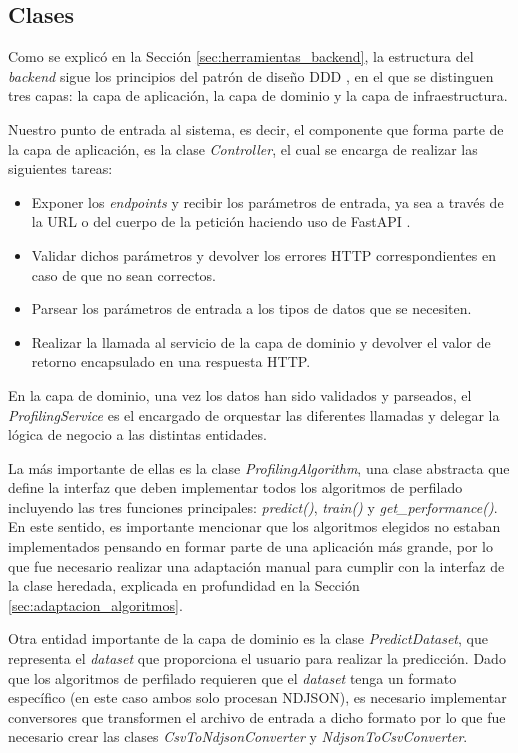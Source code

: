 \subsection{Clases}

\bigskip
Como se explicó en la Sección \ref{sec:herramientas_backend}, la estructura del \textit{backend} sigue los principios
del patrón de diseño DDD \cite{ddd}, en el que se distinguen tres capas: la capa de aplicación, la capa de dominio
y la capa de infraestructura.

\bigskip
Nuestro punto de entrada al sistema, es decir, el componente que forma parte de la capa de aplicación, es la clase
\textit{Controller}, el cual se encarga de realizar las siguientes tareas:

\begin{itemize}
	\item Exponer los \textit{endpoints} y recibir los parámetros de entrada, ya sea a través de la URL o del cuerpo de la petición
	      haciendo uso de FastAPI \cite{fastapi}.
	\item Validar dichos parámetros y devolver los errores HTTP correspondientes en caso de que no sean correctos.
	\item Parsear los parámetros de entrada a los tipos de datos que se necesiten.
	\item Realizar la llamada al servicio de la capa de dominio y devolver el valor de retorno encapsulado en una respuesta HTTP.
\end{itemize}

\bigskip
En la capa de dominio, una vez los datos han sido validados y parseados, el \textit{ProfilingService} es el encargado de orquestar
las diferentes llamadas y delegar la lógica de negocio a las distintas entidades.

\bigskip
La más importante de ellas es la clase \textit{ProfilingAlgorithm},
una clase abstracta que define la interfaz que deben implementar todos los algoritmos de perfilado incluyendo las tres funciones principales:
\textit{predict()}, \textit{train()} y \textit{get\_performance()}. En este sentido, es importante mencionar que los algoritmos elegidos no estaban implementados
pensando en formar parte de una aplicación más grande, por lo que fue necesario realizar una adaptación manual para cumplir con la interfaz de
la clase heredada, explicada en profundidad en la Sección \ref{sec:adaptacion_algoritmos}.

\bigskip
Otra entidad importante de la capa de dominio es la clase \textit{PredictDataset}, que representa el \textit{dataset} que proporciona el usuario
para realizar la predicción. Dado que los algoritmos de perfilado requieren que el \textit{dataset} tenga un formato específico (en este caso
ambos solo procesan NDJSON), es necesario implementar conversores que transformen el archivo de entrada a dicho formato por lo que
fue necesario crear las clases \textit{CsvToNdjsonConverter} y \textit{NdjsonToCsvConverter}.

